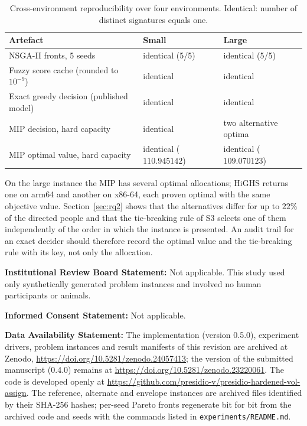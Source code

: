 \documentclass[systems,article,submit,moreauthors,pdftex]{Definitions/mdpi}
\providecommand{\dataavailability}[1]{\vspace{6pt}\noindent\textbf{Data Availability Statement:} #1\par}
\providecommand{\institutionalreview}[1]{\vspace{6pt}\noindent\textbf{Institutional Review Board Statement:} #1\par}
\providecommand{\informedconsent}[1]{\vspace{6pt}\noindent\textbf{Informed Consent Statement:} #1\par}
\begin{document}
\begin{table}[H]
\centering
\caption{Cross-environment reproducibility over four environments. Identical: number of
distinct signatures equals one.\label{tab:crossenv}}
\small
\begin{tabular}{lll}
\toprule
Artefact & Small & Large\\
\midrule
NSGA-II fronts, 5 seeds & identical (5/5) & identical (5/5)\\
Fuzzy score cache (rounded to $10^{-9}$) & identical & identical\\
Exact greedy decision (published model) & identical & identical\\
MIP decision, hard capacity & identical & two alternative optima\\
MIP optimal value, hard capacity & identical ($110.945142$) & identical ($109.070123$)\\
\bottomrule
\end{tabular}
\end{table}

On the large instance the MIP has several optimal allocations; HiGHS returns one on arm64 and
another on x86-64, each proven optimal with the same objective value. Section~\ref{sec:rq2} shows
that the alternatives differ for up to $22\%$ of the directed people and that the tie-breaking
rule of S3 selects one of them independently of the order in which the instance is presented. An
audit trail for an exact decider should therefore record the optimal value and the tie-breaking
rule with its key, not only the allocation.



\institutionalreview{Not applicable. This study used only synthetically generated problem instances and involved no human participants or animals.}

\informedconsent{Not applicable.}

\dataavailability{The implementation (version 0.5.0), experiment drivers, problem instances and result manifests of this revision are archived at Zenodo, \url{https://doi.org/10.5281/zenodo.24057413}; the version of the submitted manuscript (0.4.0) remains at \url{https://doi.org/10.5281/zenodo.23220061}. The code is developed openly at \url{https://github.com/presidio-v/presidio-hardened-vol-assign}. The reference, alternate and envelope instances are archived files identified by their SHA-256 hashes; per-seed Pareto fronts regenerate bit for bit from the archived code and seeds with the commands listed in \texttt{experiments/README.md}.}
\end{document}
